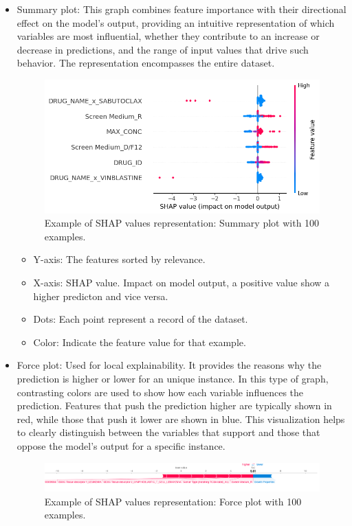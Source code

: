 \begin{itemize}
    \item Summary plot: This graph combines feature importance with their directional effect on the model's output, providing an intuitive representation of which variables are most influential, whether they contribute to an increase or decrease in predictions, and the range of input values that drive such behavior. The representation encompasses the entire dataset.
    
    \begin{figure}[H]
        \centering
        \includegraphics[width=1\textwidth]{figures/shap/shapValuesLittle.png}
        \caption{Example of SHAP values representation: Summary plot with 100 examples.}
        \label{fig:summaryPlot}
    \end{figure}

    \begin{itemize}
        \item Y-axis: The features sorted by relevance.
        \item X-axis: SHAP value. Impact on model output, a positive value show a higher predicton and vice versa.
        \item Dots: Each point represent a record of the dataset.
        \item Color: Indicate the feature value for that example.
    \end{itemize}
    

    \item Force plot: Used for local explainability. It provides the reasons why the prediction is higher or lower for an unique instance. In this type of graph, contrasting colors are used to show how each variable influences the prediction. Features that push the prediction higher are typically shown in red, while those that push it lower are shown in blue. This visualization helps to clearly distinguish between the variables that support and those that oppose the model's output for a specific instance.
    \begin{figure}[H]
        \centering
        \includegraphics[width=1\textwidth]{figures/shap/force_plot.png}
        \caption{Example of SHAP values representation: Force plot with 100 examples.}
        \label{fig:forcePlot}
    \end{figure}


\end{itemize}
